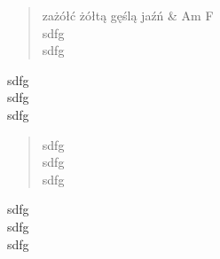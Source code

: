 
\songmaketitle

\begin{verse}
zażółć żółtą gęślą jaźń & Am F\\
sdfg\\
sdfg\\
\end{verse}

\begin{chorus}
sdfg\\
sdfg\\
sdfg\\
\end{chorus}

\begin{verse}
sdfg\\
sdfg\\
sdfg\\
\end{verse}

\begin{chorus}
sdfg\\
sdfg\\
sdfg\\
\end{chorus}
